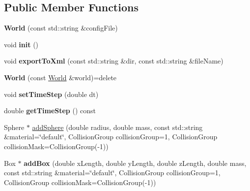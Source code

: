 \subsection*{Public Member Functions}
\begin{DoxyCompactItemize}
\item 
\mbox{\label{classraisim_1_1World_a6b6216569720095f4474426c12245d82}} 
{\bfseries World} (const std\+::string \&config\+File)
\item 
\mbox{\label{classraisim_1_1World_a546b7674bf2d1bf76107e61918aab676}} 
void {\bfseries init} ()
\item 
\mbox{\label{classraisim_1_1World_a1ef015209cd25dd3d8a11228bba0455e}} 
void {\bfseries export\+To\+Xml} (const std\+::string \&dir, const std\+::string \&file\+Name)
\item 
\mbox{\label{classraisim_1_1World_ac612c63b40ea414e086781cc24541800}} 
{\bfseries World} (const \hyperlink{classraisim_1_1World}{World} \&world)=delete
\item 
\mbox{\label{classraisim_1_1World_a545cdb33c3209154f30d70a62f945b2d}} 
void {\bfseries set\+Time\+Step} (double dt)
\item 
\mbox{\label{classraisim_1_1World_a360b07a5c8893d601988ad8e276bc379}} 
double {\bfseries get\+Time\+Step} () const
\item 
Sphere $\ast$ \hyperlink{classraisim_1_1World_af28e5c8019ae5efb62c7eed1c6ea06c6}{add\+Sphere} (double radius, double mass, const std\+::string \&material=\char`\"{}default\char`\"{}, Collision\+Group collision\+Group=1, Collision\+Group collision\+Mask=Collision\+Group(-\/1))
\item 
\mbox{\label{classraisim_1_1World_abba032d54d2e093a5a7c973641b3d340}} 
Box $\ast$ {\bfseries add\+Box} (double x\+Length, double y\+Length, double z\+Length, double mass, const std\+::string \&material=\char`\"{}default\char`\"{}, Collision\+Group collision\+Group=1, Collision\+Group collision\+Mask=Collision\+Group(-\/1))
\item 
\mbox{\label{classraisim_1_1World_a8e465e1156d13c88a062db46ed0ead2a}} 

\end{DoxyCompactItemize}
